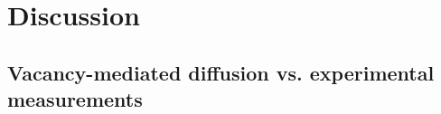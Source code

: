 \documentclass[preprint,12pt]{elsarticle}
\providecommand{\DIFdel}[1]{} %
\providecommand{\DIFdelend}{\protect\color{black}} %
\providecommand{\DIFdelFL}[1]{\DIFdel{#1}} %
\DeclareRobustCommand{\DIFdelend}{\DIFOaddend \let\includegraphics\DIFOincludegraphics} %
\begin{document}
{%
\DIFdelFL{Expected partial diffusion coefficient ratios for lanthanides in polycrystalline (isotropic) HCP Zr.}}

\DIFdelend \FloatBarrier

\section{Discussion}

\subsection{Vacancy-mediated diffusion vs. experimental measurements}
\end{document}
